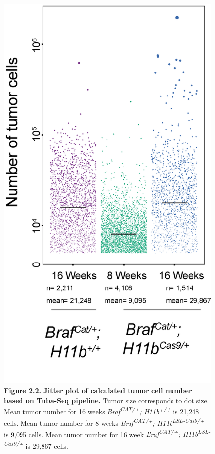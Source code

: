 \begin{figure}
\hypertarget{fig:05}{%
\centering
\includegraphics[width=1\textwidth,height=\textheight]{images/tuba2.png}
\caption{\textbf{Figure 2.2. Jitter plot of calculated tumor cell number based on Tuba-Seq pipeline.} Tumor size corresponds to dot size. Mean tumor number for 16 weeks \emph{Braf\textsuperscript{CAT/+}; H11b\textsuperscript{+/+}} is 21,248 cells. Mean tumor number for 8 weeks \emph{Braf\textsuperscript{CAT/+}; H11b\textsuperscript{LSL-Cas9/+}} is 9,095 cells. Mean tumor number for 16 week \emph{Braf\textsuperscript{CAT/+}; H11b\textsuperscript{LSL-Cas9/+}} is 29,867 cells.}\label{fig:05}
}
\end{figure}

